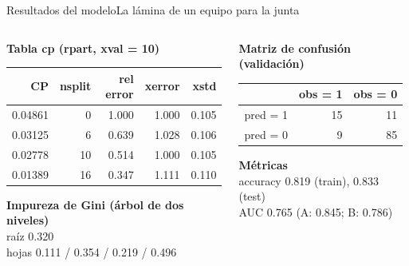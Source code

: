\documentclass{beamer}
\begin{document}
\begin{frame}{Resultados del modelo}{La lámina de un equipo para la junta}
\begin{columns}[T]
\begin{column}{0.52\textwidth}
\scriptsize
\textbf{Tabla cp (rpart, xval = 10)}\\[2pt]
{\ttfamily\setlength{\tabcolsep}{3.5pt}
\begin{tabular}{@{}rrrrr@{}}
\toprule
CP & nsplit & rel error & xerror & xstd \\
\midrule
0.04861 & 0 & 1.000 & 1.000 & 0.105 \\
0.03125 & 6 & 0.639 & 1.028 & 0.106 \\
0.02778 & 10 & 0.514 & 1.000 & 0.105 \\
0.01389 & 16 & 0.347 & 1.111 & 0.110 \\
\bottomrule
\end{tabular}}

\medskip
\textbf{Impureza de Gini (árbol de dos niveles)}\\[2pt]
{\ttfamily raíz 0.320\\ hojas 0.111 / 0.354 / 0.219 / 0.496}
\end{column}
\begin{column}{0.46\textwidth}
\scriptsize
\textbf{Matriz de confusión (validación)}\\[2pt]
{\ttfamily
\begin{tabular}{@{}lrr@{}}
\toprule
 & obs = 1 & obs = 0 \\
\midrule
pred = 1 & 15 & 11 \\
pred = 0 & 9 & 85 \\
\bottomrule
\end{tabular}}

\medskip
\textbf{Métricas}\\[2pt]
{\ttfamily accuracy 0.819 (train), 0.833 (test)\\
AUC 0.765 (A: 0.845; B: 0.786)}
\end{column}
\end{columns}
\medskip
{}
\end{frame}
\end{document}
